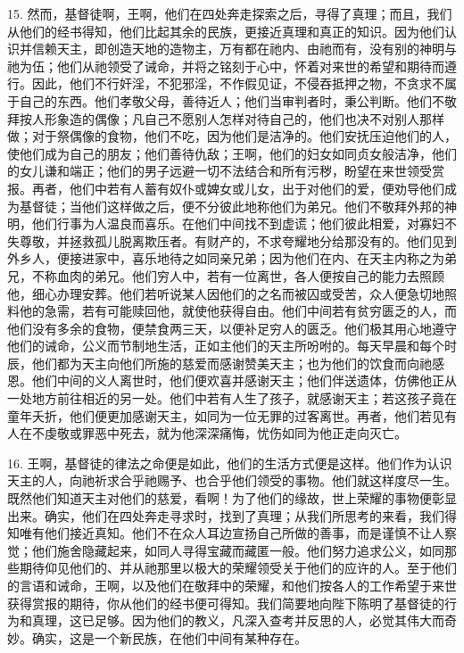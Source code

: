 15. 然而，基督徒啊，王啊，他们在四处奔走探索之后，寻得了真理；而且，我们从他们的经书得知，他们比起其余的民族，更接近真理和真正的知识。因为他们认识并信赖天主，即创造天地的造物主，万有都在祂内、由祂而有，没有别的神明与祂为伍；他们从祂领受了诫命，并将之铭刻于心中，怀着对来世的希望和期待而遵行。因此，他们不行奸淫，不犯邪淫，不作假见证，不侵吞抵押之物，不贪求不属于自己的东西。他们孝敬父母，善待近人；他们当审判者时，秉公判断。他们不敬拜按人形象造的偶像；凡自己不愿别人怎样对待自己的，他们也决不对别人那样做；对于祭偶像的食物，他们不吃，因为他们是洁净的。他们安抚压迫他们的人，使他们成为自己的朋友；他们善待仇敌；王啊，他们的妇女如同贞女般洁净，他们的女儿谦和端正；他们的男子远避一切不法结合和所有污秽，盼望在来世领受赏报。再者，他们中若有人蓄有奴仆或婢女或儿女，出于对他们的爱，便劝导他们成为基督徒；当他们这样做之后，便不分彼此地称他们为弟兄。他们不敬拜外邦的神明，他们行事为人温良而喜乐。在他们中间找不到虚谎；他们彼此相爱，对寡妇不失尊敬，并拯救孤儿脱离欺压者。有财产的，不求夸耀地分给那没有的。他们见到外乡人，便接进家中，喜乐地待之如同亲兄弟；因为他们在内、在天主内称之为弟兄，不称血肉的弟兄。他们穷人中，若有一位离世，各人便按自己的能力去照顾他，细心办理安葬。他们若听说某人因他们的之名而被囚或受苦，众人便急切地照料他的急需，若有可能赎回他，就使他获得自由。他们中间若有贫穷匮乏的人，而他们没有多余的食物，便禁食两三天，以便补足穷人的匮乏。他们极其用心地遵守他们的诫命，公义而节制地生活，正如主他们的天主所吩咐的。每天早晨和每个时辰，他们都为天主向他们所施的慈爱而感谢赞美天主；也为他们的饮食而向祂感恩。他们中间的义人离世时，他们便欢喜并感谢天主；他们伴送遗体，仿佛他正从一处地方前往相近的另一处。他们中若有人生了孩子，就感谢天主；若这孩子竟在童年夭折，他们便更加感谢天主，如同为一位无罪的过客离世。再者，他们若见有人在不虔敬或罪恶中死去，就为他深深痛悔，忧伤如同为他正走向灭亡。\par

16. 王啊，基督徒的律法之命便是如此，他们的生活方式便是这样。他们作为认识天主的人，向祂祈求合乎祂赐予、也合乎他们领受的事物。他们就这样度尽一生。既然他们知道天主对他们的慈爱，看啊！为了他们的缘故，世上荣耀的事物便彰显出来。确实，他们在四处奔走寻求时，找到了真理；从我们所思考的来看，我们得知唯有他们接近真知。他们不在众人耳边宣扬自己所做的善事，而是谨慎不让人察觉；他们施舍隐藏起来，如同人寻得宝藏而藏匿一般。他们努力追求公义，如同那些期待仰见他们的、并从祂那里以极大的荣耀领受关于他们的应许的人。至于他们的言语和诫命，王啊，以及他们在敬拜中的荣耀，和他们按各人的工作希望于来世获得赏报的期待，你从他们的经书便可得知。我们简要地向陛下陈明了基督徒的行为和真理，这已足够。因为他们的教义，凡深入查考并反思的人，必觉其伟大而奇妙。确实，这是一个新民族，在他们中间有某种存在。\par

